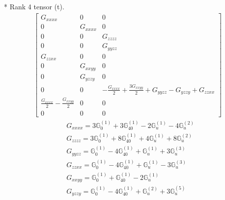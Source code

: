 \documentclass[fleqn,8pt,landscape]{jsarticle}
\begin{document}
* Rank 4 tensor (t).
\begin{align*}
\begin{bmatrix} G_{xxxx} & 0 & 0 \\ 0 & G_{xxxx} & 0 \\ 0 & 0 & G_{zzzz} \\ 0 & 0 & G_{yyzz} \\ G_{zzxx} & 0 & 0 \\ 0 & G_{xxyy} & 0 \\ 0 & G_{yzzy} & 0 \\ 0 & 0 & - \frac{G_{xxxx}}{2} + \frac{3 G_{xxyy}}{2} + G_{yyzz} - G_{yzzy} + G_{zzxx} \\ \frac{G_{xxxx}}{2} - \frac{G_{xxyy}}{2} & 0 & 0 \\ 0 & 0 & 0 \end{bmatrix}
\end{align*}
\begin{align*}
& G_{xxxx} = 3 \mathbb{G}_{0}^{(1)} + 3 \mathbb{G}_{40}^{(1)} - 2 \mathbb{G}_{u}^{(1)} - 4 \mathbb{G}_{u}^{(2)} \\
& G_{zzzz} = 3 \mathbb{G}_{0}^{(1)} + 8 \mathbb{G}_{40}^{(1)} + 4 \mathbb{G}_{u}^{(1)} + 8 \mathbb{G}_{u}^{(2)} \\
& G_{yyzz} = \mathbb{G}_{0}^{(1)} - 4 \mathbb{G}_{40}^{(1)} + \mathbb{G}_{u}^{(1)} + 3 \mathbb{G}_{u}^{(3)} \\
& G_{zzxx} = \mathbb{G}_{0}^{(1)} - 4 \mathbb{G}_{40}^{(1)} + \mathbb{G}_{u}^{(1)} - 3 \mathbb{G}_{u}^{(3)} \\
& G_{xxyy} = \mathbb{G}_{0}^{(1)} + \mathbb{G}_{40}^{(1)} - 2 \mathbb{G}_{u}^{(1)} \\
& G_{yzzy} = \mathbb{G}_{0}^{(1)} - 4 \mathbb{G}_{40}^{(1)} + \mathbb{G}_{u}^{(2)} + 3 \mathbb{G}_{u}^{(5)}
\end{align*}
\end{document}
